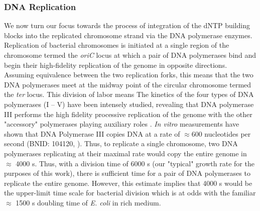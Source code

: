 \subsubsection{DNA Replication}
We now turn our focus towards the process of integration of the dNTP building
blocks into the replicated chromosome strand via the DNA polymerase enzymes.
Replication of bacterial chromosomes is initiated at a single region of the
chromosome termed the \textit{oriC} locus at which a pair of DNA polymerases
bind and begin their high-fidelity replication of the genome in opposite
directions. Assuming equivalence between the two replication forks, this
means that the two DNA polymerases meet at the midway point of the circular
chromosome termed the \textit{ter} locus. This division of labor means The
kinetics of the four types of DNA polymerases (I -- V) have been intensely
studied, revealing that DNA polymerase III performs the high fidelity
processive replication of the genome with the other "accessory" polymerases
playing auxiliary roles \cite{fijalkowska2012}. \textit{In vitro}
measurements have shown that DNA Polymerase III copies DNA at a rate of
$\approx 600$ nucleotides per second (BNID: 104120, \cite{milo2010}). Thus,
to replicate a single chromosome, two DNA polymerases replicating at their
maximal rate would copy the entire genome in $\approx$ 4000 s. Thus, with a
division time of 6000 s (our "typical" growth rate for the purposes of this
work), there is sufficient time for a pair of DNA polymerases to replicate
the entire genome. However, this estimate implies that 4000 s would be the
upper-limit time scale for bacterial division which is at odds with the
familiar $\approx$ 1500 s doubling time of \textit{E. coli} in rich medium.

